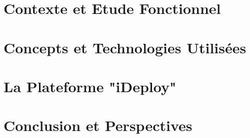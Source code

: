 \documentclass[a4paper,11pt,oneside]{report}
\begin{document}
\newpage

\chapter{Contexte et Etude Fonctionnel}

\newpage



\newpage

\chapter{Concepts et Technologies Utilisées}

\newpage



\newpage

\chapter{La Plateforme "iDeploy"}

\newpage



\newpage

\chapter*{Conclusion et Perspectives}

\newpage

\renewcommand{\appendixtocname}{Annexes}







\newpage
\end{document}
